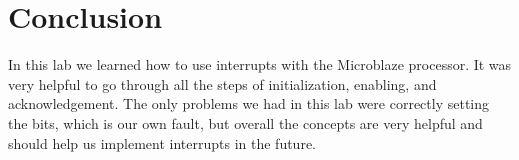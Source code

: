 \documentclass[10pt,titlepage]{article}
\begin{document}
  \section*{Conclusion}
    In this lab we learned how to use interrupts with the Microblaze processor. It was very helpful to go through all the steps of initialization, enabling, and acknowledgement. The only problems we had in this lab were correctly setting the bits, which is our own fault, but overall the concepts are very helpful and should help us implement interrupts in the future.
\end{document}
